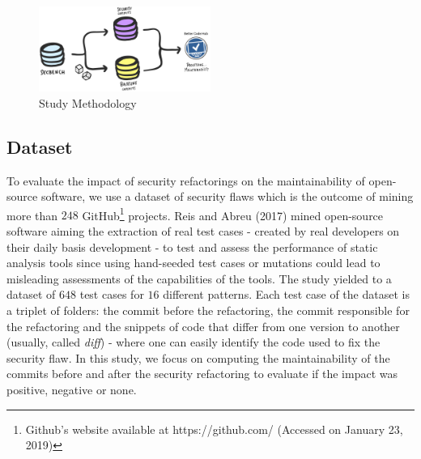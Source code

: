\documentclass[10pt,conference]{IEEEtran}
\begin{document}
\begin{figure}[h]
 	\centering 	\includegraphics[width=0.5\textwidth]{figures/methodology.pdf}
 	\caption{Study Methodology}
	\label{fig:met}
\end{figure}

\subsection{Dataset}

To evaluate the impact of security refactorings on the maintainability of open-source software, we use a dataset of security flaws which is the outcome of mining more than $248$ GitHub\footnote{Github's website available at https://github.com/ (Accessed on January 23, 2019)} projects. Reis and Abreu (2017) mined open-source software aiming the extraction of real test cases - created by real developers on their daily basis development - to test and assess the performance of static analysis tools since using hand-seeded test cases or mutations could lead to misleading assessments of the capabilities of the tools. The study yielded to a dataset of $648$ test cases for $16$ different patterns. Each test case of the dataset is a triplet of folders: the commit before the refactoring, the commit responsible for the refactoring and the snippets of code that differ from one version to another (usually, called \textit{diff}) - where one can easily identify the code used to fix the security flaw. In this study, we focus on computing the maintainability of the commits before and after the security refactoring to evaluate if the impact was positive, negative or none.
\end{document}
